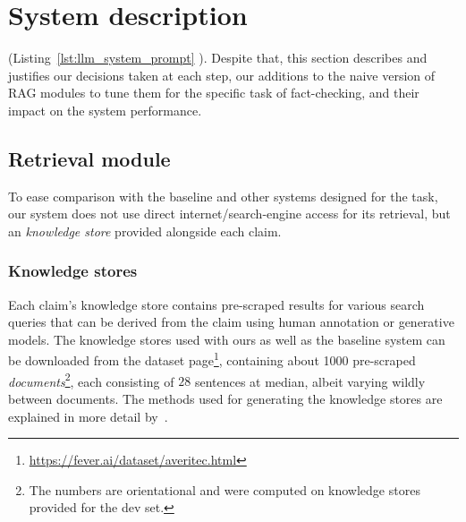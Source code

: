 \section{System description}
\label{sec:system}
 (Listing~\ref{lst:llm_system_prompt} ).
Despite that, this section describes and justifies our decisions taken at each step, our additions to the naive version of RAG modules to tune them for the specific task of fact-checking, and their impact on the system performance.

\subsection{Retrieval module}
\label{retrieval}
To ease comparison with the baseline and other systems designed for the task, our system does not use direct internet/search-engine access for its retrieval, but an \averitec{} \textit{knowledge store} provided alongside each claim.


\subsubsection{Knowledge stores}
Each claim's knowledge store contains pre-scraped results for various search queries that can be derived from the claim using human annotation or generative models.
The knowledge stores used with ours as well as the baseline system can be downloaded from the \averitec{}  dataset page\footnote{\url{https://fever.ai/dataset/averitec.html}}, containing about 1000 pre-scraped \textit{documents}\footnote{\label{devsetnote}The numbers are orientational and were computed on knowledge stores provided for the \averitec{}  dev set.}, each consisting of $28$ sentences at median, albeit varying wildly between documents.
The methods used for generating the knowledge stores are explained in more detail by~\citet{averitec2024}.

